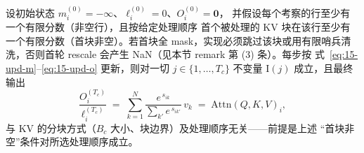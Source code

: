 \begin{theorem}\label{thm:15-invariant}
  设初始状态 $m^{(0)}_i = -\infty$、$\ell^{(0)}_i = 0$、$O^{(0)}_i = \mathbf{0}$，
  并假设每个考察的行至少有一个有限分数（非空行），且按给定处理顺序
  首个被处理的 KV 块在该行至少有一个有限分数（首块非空）。若首块全
  mask，实现必须跳过该块或用有限哨兵清洗，否则首轮 rescale 会产生
  NaN（见本节 remark 第 (3) 条）。每步按
  式~\ref{eq:15-upd-m}--\ref{eq:15-upd-o} 更新，则对一切
  $j \in \{1, \dots, T_c\}$ 不变量 $\mathrm{I}(j)$ 成立，且最终输出
  \begin{equation}
    \frac{O^{(T_c)}_i}{\ell^{(T_c)}_i}
    \;=\; \sum_{k=1}^{N} \frac{e^{\,s_{ik}}}{\sum_{k'} e^{\,s_{ik'}}}\, v_k
    \;=\; \mathrm{Attn}(Q,K,V)_i ,
  \end{equation}
  与 KV 的分块方式（$B_c$ 大小、块边界）及处理顺序无关——前提是上述
  “首块非空”条件对所选处理顺序成立。
\end{theorem}

